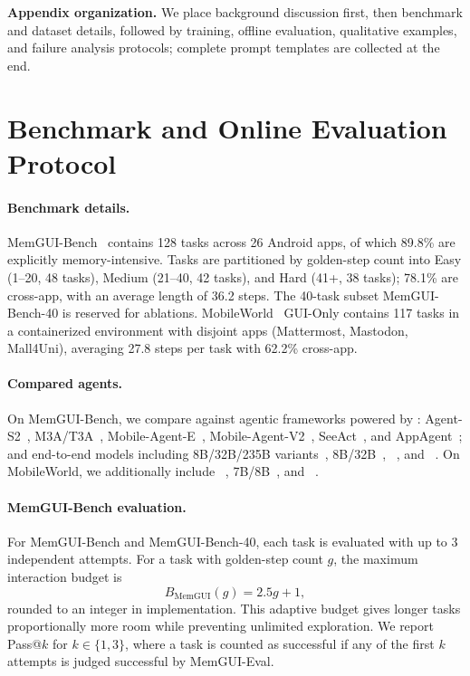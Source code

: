 \clearpage
\appendix

\noindent\textbf{Appendix organization.}
We place background discussion first, then benchmark and dataset details, followed by training, offline evaluation, qualitative examples, and failure analysis protocols; complete prompt templates are collected at the end.



\section{Benchmark and Online Evaluation Protocol}
\label{sec:appendix-eval-protocol}

\paragraph{Benchmark details.}
MemGUI-Bench~\cite{liu2026memgui} contains 128 tasks across 26 Android apps, of which 89.8\% are explicitly memory-intensive. Tasks are partitioned by golden-step count into Easy (1--20, 48 tasks), Medium (21--40, 42 tasks), and Hard (41+, 38 tasks); 78.1\% are cross-app, with an average length of 36.2 steps. The 40-task subset MemGUI-Bench-40 is reserved for ablations. MobileWorld~\cite{kong2025mobileworld} GUI-Only contains 117 tasks in a containerized environment with disjoint apps (Mattermost, Mastodon, Mall4Uni), averaging 27.8 steps per task with 62.2\% cross-app.

\paragraph{Compared agents.}
On MemGUI-Bench, we compare against agentic frameworks powered by : Agent-S2~\cite{agashe2025agent}, M3A/T3A~\cite{rawles2025androidworld}, Mobile-Agent-E~\cite{wang2025mobileagentselfevolving}, Mobile-Agent-V2~\cite{wang2024mobile}, SeeAct~\cite{zheng2024seeact}, and AppAgent~\cite{zhang2025appagent}; and end-to-end models including  8B/32B/235B variants~\cite{bai2025qwen3},  8B/32B~\cite{xu2026mobile}, ~\cite{qin2025ui}, and ~\cite{gu2025ui-venus}. On MobileWorld, we additionally include ~\cite{ScaleCUA2025},  7B/8B~\cite{OpenMobile2025}, and ~\cite{tang2026clawgui}.

\paragraph{MemGUI-Bench evaluation.}
For MemGUI-Bench and MemGUI-Bench-40, each task is evaluated with up to 3 independent attempts. For a task with golden-step count $g$, the maximum interaction budget is
\[
B_{\mathrm{MemGUI}}(g) = 2.5g + 1,
\]
rounded to an integer in implementation. This adaptive budget gives longer tasks proportionally more room while preventing unlimited exploration. We report Pass@$k$ for $k{\in}\{1,3\}$, where a task is counted as successful if any of the first $k$ attempts is judged successful by MemGUI-Eval.


